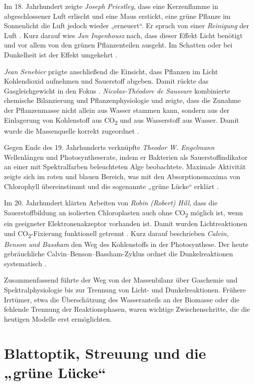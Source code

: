 Im 18. Jahrhundert zeigte \textit{Joseph Priestley}, dass eine Kerzenflamme in abgeschlossener Luft erlischt und eine Maus erstickt, eine grüne Pflanze im Sonnenlicht die Luft jedoch wieder „erneuert“. Er sprach von einer \textit{Reinigung} der Luft \parencite{priestley1772_acs}. Kurz darauf wies \textit{Jan Ingenhousz} nach, dass dieser Effekt Licht benötigt und vor allem von den grünen Pflanzenteilen ausgeht. Im Schatten oder bei Dunkelheit ist der Effekt umgekehrt \parencite{ingenhousz1779}. 

\textit{Jean Senebier} prägte anschließend die Einsicht, dass Pflanzen im Licht Kohlendioxid aufnehmen und Sauerstoff abgeben. Damit rückte das Gasgleichgewicht in den Fokus \parencite{senebier_britannica}. \textit{Nicolas-Théodore de Saussure} kombinierte chemische Bilanzierung und Pflanzenphysiologie und zeigte, dass die Zunahme der Pflanzenmasse nicht allein aus Wasser stammen kann, sondern aus der Einlagerung von Kohlenstoff aus CO\textsubscript{2} und aus Wasserstoff aus Wasser. Damit wurde die Massenquelle korrekt zugeordnet \parencite{desaussure1804}.

Gegen Ende des 19. Jahrhunderts verknüpfte \textit{Theodor W. Engelmann} Wellenlängen und Photosyntheserate, indem er Bakterien als Sauerstoffindikator an einer mit Spektralfarben beleuchteten Alge beobachtete. Maximale Aktivität zeigte sich im roten und blauen Bereich, was mit den Absorptionsmaxima von Chlorophyll übereinstimmt und die sogenannte „grüne Lücke“ erklärt \parencite{engelmann1882_summary}.

Im 20. Jahrhundert klärten Arbeiten von \textit{Robin (Robert) Hill}, dass die Sauerstoffbildung an isolierten Chloroplasten auch ohne CO\textsubscript{2} möglich ist, wenn ein geeigneter Elektronenakzeptor vorhanden ist. Damit wurden Lichtreaktionen und CO\textsubscript{2}-Fixierung funktionell getrennt \parencite{hill1937}. Kurz darauf beschrieben \textit{Calvin, Benson und Bassham} den Weg des Kohlenstoffs in der Photosynthese. Der heute gebräuchliche Calvin–Benson–Bassham-Zyklus ordnet die Dunkelreaktionen systematisch \parencite{bassham1950}.

Zusammenfassend führte der Weg von der Massenbilanz über Gaschemie und Spektralphysiologie bis zur Trennung von Licht- und Dunkelreaktionen. Frühere Irrtümer, etwa die Überschätzung des Wasseranteils an der Biomasse oder die fehlende Trennung der Reaktionsphasen, waren wichtige Zwischenschritte, die die heutigen Modelle erst ermöglichten.


\section{Blattoptik, Streuung und die „grüne Lücke“}

